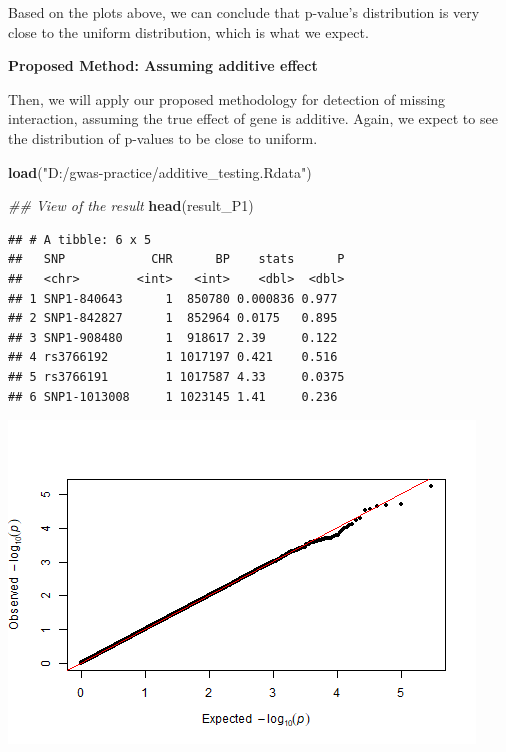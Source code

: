 \documentclass[
]{article}
\newenvironment{Shaded}{\begin{snugshade}}{\end{snugshade}}
\newcommand{\CommentTok}[1]{\textcolor[rgb]{0.56,0.35,0.01}{\textit{#1}}}
\newcommand{\KeywordTok}[1]{\textcolor[rgb]{0.13,0.29,0.53}{\textbf{#1}}}
\newcommand{\NormalTok}[1]{#1}
\newcommand{\OperatorTok}[1]{\textcolor[rgb]{0.81,0.36,0.00}{\textbf{#1}}}
\newcommand{\StringTok}[1]{\textcolor[rgb]{0.31,0.60,0.02}{#1}}
\begin{document}
Based on the plots above, we can conclude that p-value's distribution is
very close to the uniform distribution, which is what we expect.

\clearpage

\textbf{Proposed Method: Assuming additive effect}

Then, we will apply our proposed methodology for detection of missing
interaction, assuming the true effect of gene is additive. Again, we
expect to see the distribution of p-values to be close to uniform.

\begin{Shaded}
\begin{Highlighting}[]
\KeywordTok{load}\NormalTok{(}\StringTok{"D:/gwas-practice/additive_testing.Rdata"}\NormalTok{)}

\CommentTok{## View of the result}
\KeywordTok{head}\NormalTok{(result_P1)}
\end{Highlighting}
\end{Shaded}

\begin{verbatim}
## # A tibble: 6 x 5
##   SNP            CHR      BP    stats      P
##   <chr>        <int>   <int>    <dbl>  <dbl>
## 1 SNP1-840643      1  850780 0.000836 0.977 
## 2 SNP1-842827      1  852964 0.0175   0.895 
## 3 SNP1-908480      1  918617 2.39     0.122 
## 4 rs3766192        1 1017197 0.421    0.516 
## 5 rs3766191        1 1017587 4.33     0.0375
## 6 SNP1-1013008     1 1023145 1.41     0.236
\end{verbatim}

\begin{Shaded}
\end{Shaded}

\includegraphics{stats-gene-research-progress-v9_files/figure-latex/unnamed-chunk-3-1.png}
\end{document}
